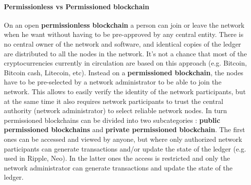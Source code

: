\paragraph{Permissionless vs Permissioned blockchain} On an open \textbf{permissionless blockchain} a person can join or leave the network when he want without having to be pre-approved by any central entity. There is no central owner of the network and software, and identical copies of the ledger are distributed to all the nodes in the network. It's not a chance that most of the cryptocurrencies currently in circulation are based on this approach (e.g. Bitcoin, Bitcoin cash, Litecoin, etc). Instead on a \textbf{permissioned blockchain}, the nodes have to be pre-selected by a network administrator to be able to join the network. This allows to easily verify the identity of the network participants, but at the same time it also requires network participants to trust the central authority (network administrator) to select reliable network nodes. In turn permissioned blockchains can be divided into two subcategories : \textbf{public permissioned blockchains} and \textbf{private permissioned blockchain}. The first ones can be accessed and viewed by anyone, but where only authorized network participants can generate transactions and/or update the state of the ledger (e.g. used in Ripple, Neo). In the latter ones the access is restricted and only the network administrator can generate transactions and update the state of the ledger.

